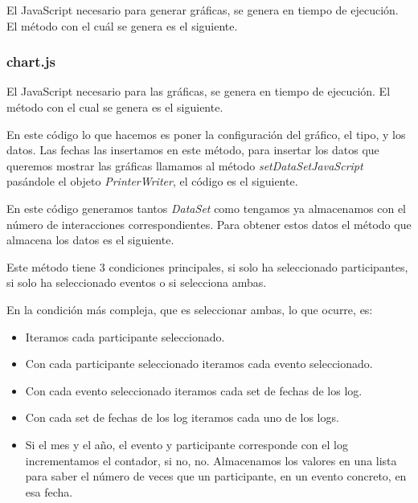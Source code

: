 El JavaScript necesario para generar gráficas, se genera en tiempo de ejecución. El método con el cuál se genera es el siguiente.


\newpage\subsubsection{chart.js}\label{chart-js}

El JavaScript necesario para las gráficas, se genera en tiempo de ejecución. El método con el cual se genera es el siguiente.

\newpage
En este código lo que hacemos es poner la configuración del gráfico, el tipo, y los datos. Las fechas las insertamos en este método, para insertar los datos que queremos mostrar las gráficas llamamos al método \emph{setDataSetJavaScript} pasándole el objeto \emph{PrinterWriter}, el código es el siguiente.

\newpage
En este código generamos tantos \emph{DataSet} como tengamos ya almacenamos con el número de interacciones correspondientes. Para obtener estos datos el método que almacena los datos es el siguiente.


Este método tiene 3 condiciones principales, si solo ha seleccionado participantes, si solo ha seleccionado eventos o si selecciona ambas.

En la condición más compleja, que es seleccionar ambas, lo que ocurre, es:

\begin{itemize}
	\tightlist
	\item
	Iteramos cada participante seleccionado.
	\item
	Con cada participante seleccionado iteramos cada evento seleccionado.
	\item
	Con cada evento seleccionado iteramos cada set de fechas de los log.
	\item
	Con cada set de fechas de los log iteramos cada uno de los logs.
	\item
	Si el mes y el año, el evento y participante corresponde con el log incrementamos el contador, si no, no. Almacenamos los valores en una lista para saber el número de veces que un participante, en un evento concreto, en esa fecha.
\end{itemize}


